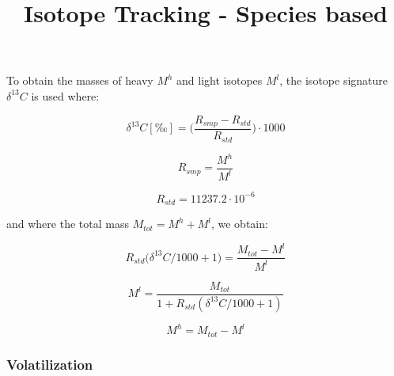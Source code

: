 \documentclass[]{article}
\title{Isotope Tracking - Species based}
\author{}
\date{}
\begin{document}
\maketitle

To obtain the masses of heavy \(M^h\) and light isotopes \(M^l\), the
isotope signature \(\delta ^{13}C\) is used where:

\[
\delta ^{13}C [‰] = \Big(\frac{R_{smp} - R_{std}}{R_{std}}\Big)\cdot 1000
\]

\[
R_{smp} = \frac{M^h}{M^l} 
\]

\[
R_{std} = 11237.2 \cdot 10^{-6}
\]

and where the total mass \(M_{tot} = M^h + M^l\), we obtain:

\[
R_{std}\Big(\delta ^{13}C/1000+1 \Big)= \frac{M_{tot}-M^l}{M^l}
\]

\[
M^l = \frac{M_{tot}}{1+R_{std}(\delta ^{13}C/1000+1)}
\]

\[
M^h = M_{tot} - M^l 
\]

\subsubsection{Volatilization}\label{volatilization}
\end{document}
